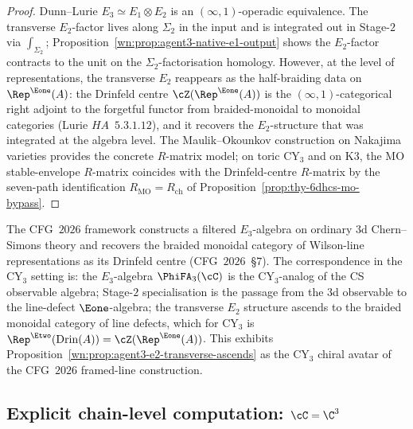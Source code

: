 \begin{proof}
Dunn--Lurie $E_3\simeq E_1\otimes E_2$ is an $(\infty,1)$-operadic equivalence. The transverse $E_2$-factor lives along $\Sigma_2$ in the input and is integrated out in Stage-$2$ via $\int_{\Sigma_2}$; Proposition~\ref{wn:prop:agent3-native-e1-output} shows the $E_2$-factor contracts to the unit on the $\Sigma_2$-factorisation homology. However, at the level of representations, the transverse $E_2$ reappears as the half-braiding data on $\Rep^{\Eone}(A)$: the Drinfeld centre $\cZ(\Rep^{\Eone}(A))$ is the $(\infty,1)$-categorical right adjoint to the forgetful functor from braided-monoidal to monoidal categories (Lurie $HA$~$5.3.1.12$), and it recovers the $E_2$-structure that was integrated at the algebra level. The Maulik--Okounkov construction on Nakajima varieties provides the concrete $R$-matrix model; on toric CY$_3$ and on K3, the MO stable-envelope $R$-matrix coincides with the Drinfeld-centre $R$-matrix by the seven-path identification $R_{\mathrm{MO}}=R_{\mathrm{ch}}$ of Proposition~\ref{prop:thy-6dhcs-mo-bypass}.
\end{proof}

\begin{remark}
\label{wn:rem:agent3-cfg-e2-transverse}
The CFG~$2026$ framework constructs a filtered $E_3$-algebra on ordinary $3$d Chern--Simons theory and recovers the braided monoidal category of Wilson-line representations as its Drinfeld centre (CFG~$2026$~\S$7$). The correspondence in the CY$_3$ setting is: the $E_3$-algebra $\PhiFA_3(\cC)$ is the CY$_3$-analog of the CS observable algebra; Stage-$2$ specialisation is the passage from the $3$d observable to the line-defect $\Eone$-algebra; the transverse $E_2$ structure ascends to the braided monoidal category of line defects, which for CY$_3$ is $\Rep^{\Etwo}(\mathrm{Drin}(A))=\cZ(\Rep^{\Eone}(A))$. This exhibits Proposition~\ref{wn:prop:agent3-e2-transverse-ascends} as the CY$_3$ chiral avatar of the CFG~$2026$ framed-line construction.
\end{remark}

\subsection{Explicit chain-level computation: \texorpdfstring{$\cC=\C^3$}{C = C-3}}
\label{wn:subsec:agent3-c3-computation}

